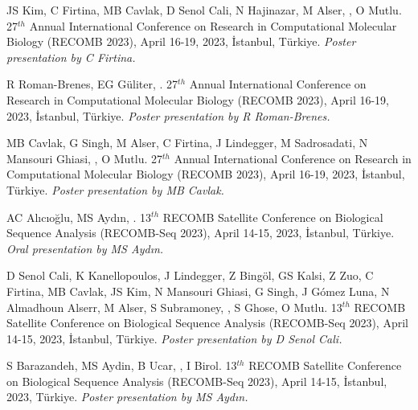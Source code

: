\vspace{-.2cm}{\bf AirLift: a fast and comprehensive technique for remapping alignments between reference genomes.} JS Kim, C Firtina, MB Cavlak, D Senol Cali, N Hajinazar, M Alser, \calkan{}, O Mutlu. 27$^{th}$ Annual International Conference on Research in Computational Molecular Biology (RECOMB 2023), April 16-19, 2023, İstanbul, Türkiye. {\it Poster presentation by C Firtina.}

\vspace{-.2cm}{\bf Fast identification of sepsis antibiotic resistance.}  R Roman-Brenes, EG Güliter,  \calkan{}. 27$^{th}$ Annual International Conference on Research in Computational Molecular Biology (RECOMB 2023), April 16-19, 2023, İstanbul, Türkiye. {\it Poster presentation by R Roman-Brenes.}

\vspace{-.2cm}{\bf TargetCall: eliminating the wasted computation in basecalling via pre-basecalling filtering.} MB Cavlak, G Singh, M Alser, C Firtina, J Lindegger, M Sadrosadati, N Mansouri Ghiasi,  \calkan{}, O Mutlu. 27$^{th}$ Annual International Conference on Research in Computational Molecular Biology (RECOMB 2023), April 16-19, 2023, İstanbul, Türkiye. {\it Poster presentation by MB Cavlak.}

\clearpage

\vspace{-.2cm}{\bf Pairwise sequence alignment with block and character edit operations.} AC Alıcıoğlu, MS Aydın, \calkan{}. 13$^{th}$ RECOMB Satellite Conference on Biological Sequence Analysis (RECOMB-Seq 2023), April 14-15, 2023, İstanbul, Türkiye. {\it Oral presentation by MS Aydın.}


\vspace{-.2cm}{\bf SeGraM: a universal hardware accelerator for genomic sequence-to-graph and sequence-to-sequence mapping.} D Senol Cali, K Kanellopoulos, J Lindegger, Z Bingöl, GS Kalsi, Z Zuo, C Firtina, MB Cavlak, JS Kim, N Mansouri Ghiasi, G Singh, J Gómez Luna, N Almadhoun Alserr, M Alser, S Subramoney, \calkan{}, S Ghose, O Mutlu. 13$^{th}$ RECOMB Satellite Conference on Biological Sequence Analysis (RECOMB-Seq 2023), April 14-15, 2023, İstanbul, Türkiye. {\it Poster presentation by D Senol Cali.}

\vspace{-.2cm}{\bf Using minimizer interarrival distances for read-until human read detection from blood samples sequenced by Oxford Nanopore.} S Barazandeh, MS Aydin, B Ucar, \calkan{}, I Birol. 13$^{th}$ RECOMB Satellite Conference on Biological Sequence Analysis (RECOMB-Seq 2023), April 14-15, İstanbul, 2023, Türkiye. {\it Poster presentation by MS Aydın.}


